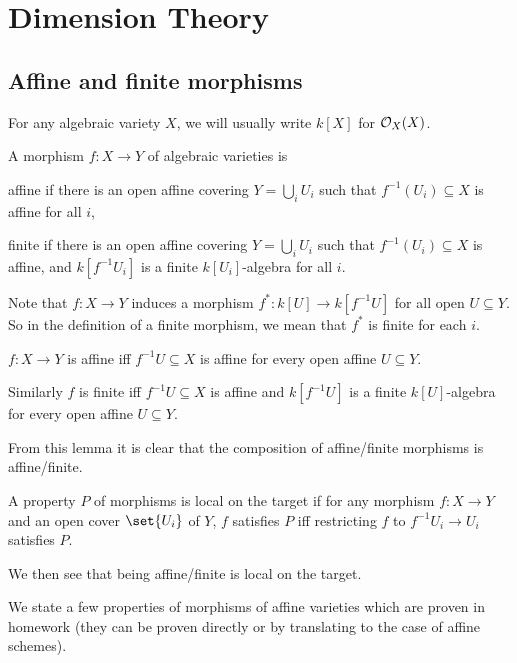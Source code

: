 \section{Dimension Theory}

\subsection{Affine and finite morphisms}

\bnote

    For any algebraic variety $X$, we will usually write $k[X]$ for ${{\cal O}}_X(X)$.

\enote

\bdefn

    A morphism $f\colon X\to Y$ of algebraic varieties is
    \benum
        \item {\emphcolor affine} if there is an open affine covering $Y=\bigcup_iU_i$ such that $f^{-1}(U_i)\subseteq X$ is affine for all $i$,
        \item {\emphcolor finite} if there is an open affine covering $Y=\bigcup_iU_i$ such that $f^{-1}(U_i)\subseteq X$ is affine, and $k[f^{-1}U_i]$ is a finite $k[U_i]$-algebra for all $i$.
    \eenum

\edefn

Note that $f\colon X\to Y$ induces a morphism $f^*\colon k[U]\to k[f^{-1}U]$ for all open $U\subseteq Y$.
So in the definition of a finite morphism, we mean that $f^*$ is finite for each $i$.

\blemm

    $f\colon X\to Y$ is affine iff $f^{-1}U\subseteq X$ is affine for every open affine $U\subseteq Y$.

    Similarly $f$ is finite iff $f^{-1}U\subseteq X$ is affine and $k[f^{-1}U]$ is a finite $k[U]$-algebra for every open affine $U\subseteq Y$.

\elemm

From this lemma it is clear that the composition of affine/finite morphisms is affine/finite.

\bdefn

    A property $P$ of morphisms is {\emphcolor local on the target} if for any morphism $f\colon X\to Y$ and an open cover $\set{U_i}$ of $Y$,
    $f$ satisfies $P$ iff restricting $f$ to $f^{-1}U_i\to U_i$ satisfies $P$.

\edefn

We then see that being affine/finite is local on the target.

We state a few properties of morphisms of affine varieties which are proven in homework (they can be proven directly or by translating to the case of affine schemes).

